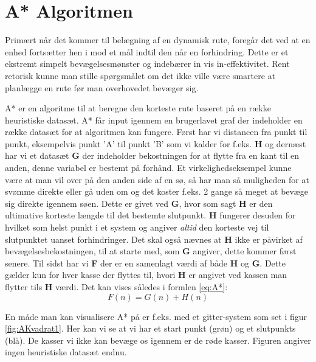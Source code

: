 \vspace{5mm}

\section{A* Algoritmen}
Primært når det kommer til belægning af en dynamisk rute, foregår det ved at en enhed fortsætter hen i mod et mål indtil den når en forhindring. Dette er et ekstremt simpelt bevægelsesmønster og indebærer in vis in-effektivitet. Rent retorisk kunne man stille spørgsmålet om det ikke ville være smartere at planlægge en rute før man overhovedet bevæger sig.

\vspace{5mm}

A* er en algoritme til at beregne den korteste rute baseret på en række heuristiske datasæt. A* får input igennem en brugerlavet graf der indeholder en række datasæt for at algoritmen kan fungere.  Først har vi distancen fra punkt til punkt, eksempelvis punkt 'A' til punkt 'B' som vi kalder for f.eks. \textbf{H} og dernæst har vi et datasæt \textbf{G} der indeholder bekostningen for at flytte fra en kant til en anden, denne variabel er bestemt på forhånd. Et virkelighedseksempel kunne være at man vil over på den anden side af en sø, så har man så muligheden for at svømme direkte eller gå uden om og det koster f.eks. 2 gange så meget at bevæge sig direkte igennem søen. Dette er givet ved \textbf{G}, hvor som sagt \textbf{H} er den ultimative korteste længde til det bestemte slutpunkt. \textbf{H} fungerer desuden for hvilket som helst punkt i et system og angiver \textit{altid} den korteste vej til slutpunktet uanset forhindringer. Det skal også nævnes at \textbf{H} ikke er påvirket af bevægelsesbekostningen, til at starte med, som \textbf{G} angiver, dette kommer først senere. Til sidst har vi \textbf{F} der er en samenlagt værdi af både \textbf{H} og \textbf{G}. Dette gælder kun for hver kasse der flyttes til, hvori \textbf{H} er angivet ved kassen man flytter tils \textbf{H} værdi. Det kan vises således i formlen \ref{eq:A*}:
\begin{equation} \label{eq:A*}
F(n) = G(n) + H(n)
\end{equation}

En måde man kan visualisere A* på er f.eks. med et gitter-system som set i figur \ref{fig:AKvadrat1}. Her kan vi se at vi har et start punkt (grøn) og et slutpunkts (blå). De kasser vi ikke kan bevæge os igennem er de røde kasser. Figuren angiver ingen heuristiske datasæt endnu.

